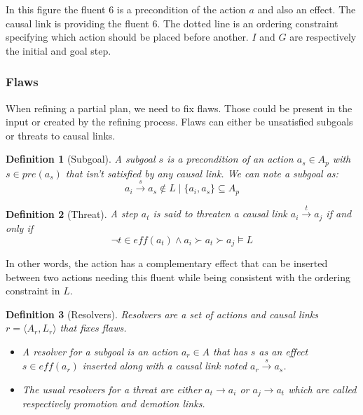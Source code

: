 \documentclass[]{article}
\providecommand{\tightlist}{%
  \setlength{\itemsep}{0pt}\setlength{\parskip}{0pt}}
\newtheorem{definition}{Definition}
\begin{document}
In this figure the fluent \(6\) is a precondition of the action \(a\)
and also an effect. The causal link is providing the fluent \(6\). The
dotted line is an ordering constraint specifying which action should be
placed before another. \(I\) and \(G\) are respectively the initial and
goal step.

\subsubsection{Flaws}\label{flaws}

When refining a partial plan, we need to fix flaws. Those could be
present in the input or created by the refining process. Flaws can
either be unsatisfied subgoals or threats to causal links.

\begin{definition}[Subgoal]

A subgoal \(s\) is a precondition of an action \(a_s \in A_p\) with
\(s \in pre(a_s)\) that isn't satisfied by any causal link. We can note
a subgoal as:
\[a_i \xrightarrow{s} a_s \notin L \mid \{ a_i, a_s \} \subseteq A_p \]

\end{definition}

\begin{definition}[Threat]

A step \(a_t\) is said to threaten a causal link
\(a_i \xrightarrow{t} a_j\) if and only if
\[\neg t \in eff(a_t) \land a_i \succ a_t \succ a_j \models L\]

\end{definition}

In other words, the action has a complementary effect that can be
inserted between two actions needing this fluent while being consistent
with the ordering constraint in \(L\).

\begin{definition}[Resolvers]

Resolvers are a set of actions and causal links
\(r = \langle A_r , L_r \rangle\) that fixes flaws.

\begin{itemize}
\tightlist
\item
  A resolver for a subgoal is an action \(a_r \in A\) that has \(s\) as
  an effect \(s \in eff(a_r)\) inserted along with a causal link noted
  \(a_r \xrightarrow{s} a_s\).
\item
  The usual resolvers for a threat are either \(a_t \to a_i\) or
  \(a_j \to a_t\) which are called respectively promotion and demotion
  links.
\end{itemize}

\end{definition}
\end{document}
